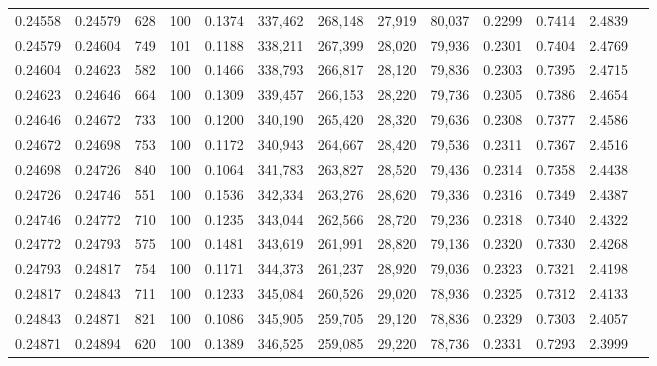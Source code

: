 \begin{tabular}{rrrrrrrrrrrrr}
0.24558 & 0.24579 &   628 & 100 &                                     0.1374 & 337,462 & 268,148 &  27,919 &  80,037 & 0.2299 & 0.7414 & 2.4839 \\
0.24579 & 0.24604 &   749 & 101 &                                     0.1188 & 338,211 & 267,399 &  28,020 &  79,936 & 0.2301 & 0.7404 & 2.4769 \\
0.24604 & 0.24623 &   582 & 100 &                                     0.1466 & 338,793 & 266,817 &  28,120 &  79,836 & 0.2303 & 0.7395 & 2.4715 \\
0.24623 & 0.24646 &   664 & 100 &                                     0.1309 & 339,457 & 266,153 &  28,220 &  79,736 & 0.2305 & 0.7386 & 2.4654 \\
0.24646 & 0.24672 &   733 & 100 &                                     0.1200 & 340,190 & 265,420 &  28,320 &  79,636 & 0.2308 & 0.7377 & 2.4586 \\
0.24672 & 0.24698 &   753 & 100 &                                     0.1172 & 340,943 & 264,667 &  28,420 &  79,536 & 0.2311 & 0.7367 & 2.4516 \\
0.24698 & 0.24726 &   840 & 100 &                                     0.1064 & 341,783 & 263,827 &  28,520 &  79,436 & 0.2314 & 0.7358 & 2.4438 \\
0.24726 & 0.24746 &   551 & 100 &                                     0.1536 & 342,334 & 263,276 &  28,620 &  79,336 & 0.2316 & 0.7349 & 2.4387 \\
0.24746 & 0.24772 &   710 & 100 &                                     0.1235 & 343,044 & 262,566 &  28,720 &  79,236 & 0.2318 & 0.7340 & 2.4322 \\
0.24772 & 0.24793 &   575 & 100 &                                     0.1481 & 343,619 & 261,991 &  28,820 &  79,136 & 0.2320 & 0.7330 & 2.4268 \\
0.24793 & 0.24817 &   754 & 100 &                                     0.1171 & 344,373 & 261,237 &  28,920 &  79,036 & 0.2323 & 0.7321 & 2.4198 \\
0.24817 & 0.24843 &   711 & 100 &                                     0.1233 & 345,084 & 260,526 &  29,020 &  78,936 & 0.2325 & 0.7312 & 2.4133 \\
0.24843 & 0.24871 &   821 & 100 &                                     0.1086 & 345,905 & 259,705 &  29,120 &  78,836 & 0.2329 & 0.7303 & 2.4057 \\
0.24871 & 0.24894 &   620 & 100 &                                     0.1389 & 346,525 & 259,085 &  29,220 &  78,736 & 0.2331 & 0.7293 & 2.3999 \\

\end{tabular}
